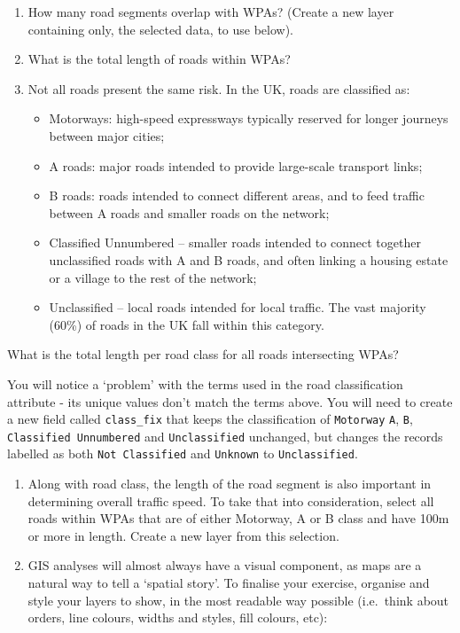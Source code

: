 \documentclass[
  letterpaper,
  DIV=11,
  numbers=noendperiod]{scrreprt}
\providecommand{\tightlist}{%
  \setlength{\itemsep}{0pt}\setlength{\parskip}{0pt}}\usepackage{longtable,booktabs,array}
\begin{document}
\begin{enumerate}
  \begin{enumerate}
  \def\labelenumii{\alph{enumii})}
  \item
    How many road segments overlap with WPAs? (Create a new layer
    containing only, the selected data, to use below).
  \item
    What is the total length of roads within WPAs?
  \item
    Not all roads present the same risk. In the UK, roads are classified
    as:

    \begin{itemize}
    \tightlist
    \item
      Motorways: high-speed expressways typically reserved for longer
      journeys between major cities;
    \item
      A roads: major roads intended to provide large-scale transport
      links;
    \item
      B roads: roads intended to connect different areas, and to feed
      traffic between A roads and smaller roads on the network;
    \item
      Classified Unnumbered -- smaller roads intended to connect
      together unclassified roads with A and B roads, and often linking
      a housing estate or a village to the rest of the network;
    \item
      Unclassified -- local roads intended for local traffic. The vast
      majority (60\%) of roads in the UK fall within this category.
    \end{itemize}
  \end{enumerate}
\end{enumerate}

What is the total length per road class for all roads intersecting WPAs?

You will notice a `problem' with the terms used in the road
classification attribute - its unique values don't match the terms
above. You will need to create a new field called \texttt{class\_fix}
that keeps the classification of \texttt{Motorway} \texttt{A},
\texttt{B}, \texttt{Classified\ Unnumbered} and \texttt{Unclassified}
unchanged, but changes the records labelled as both
\texttt{Not\ Classified} and \texttt{Unknown} to \texttt{Unclassified}.

\begin{enumerate}
\def\labelenumi{\alph{enumi})}
\setcounter{enumi}{3}
\item
  Along with road class, the length of the road segment is also
  important in determining overall traffic speed. To take that into
  consideration, select all roads within WPAs that are of either
  Motorway, A or B class and have 100m or more in length. Create a new
  layer from this selection.
\item
  GIS analyses will almost always have a visual component, as maps are a
  natural way to tell a `spatial story'. To finalise your exercise,
  organise and style your layers to show, in the most readable way
  possible (i.e.~think about orders, line colours, widths and styles,
  fill colours, etc):
\end{enumerate}
\end{document}
